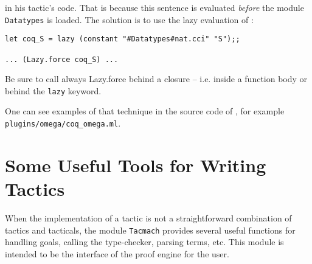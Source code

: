 in his tactic's code. That is because this sentence is evaluated
\emph{before} the module \texttt{Datatypes} is loaded. The solution is
to use the lazy evaluation of \ocaml{}:


\begin{verbatim}
let coq_S = lazy (constant "#Datatypes#nat.cci" "S");;

... (Lazy.force coq_S) ...
\end{verbatim}


Be sure to call always Lazy.force behind a closure -- i.e. inside a
function body or behind the \texttt{lazy} keyword.

One can see examples of that technique in the source code of \Coq{},
for example 
\verb+plugins/omega/coq_omega.ml+.

\section[Some Useful Tools for Writing Tactics]{Some Useful Tools for Writing Tactics\label{SomeUsefulToolsforWrittingTactics}}
When the implementation of a tactic is not a straightforward
combination of tactics and tacticals, the module \texttt{Tacmach}
provides several useful functions for handling goals, calling the
type-checker, parsing terms, etc. This module is intended to be 
the interface of the proof engine for the user.

